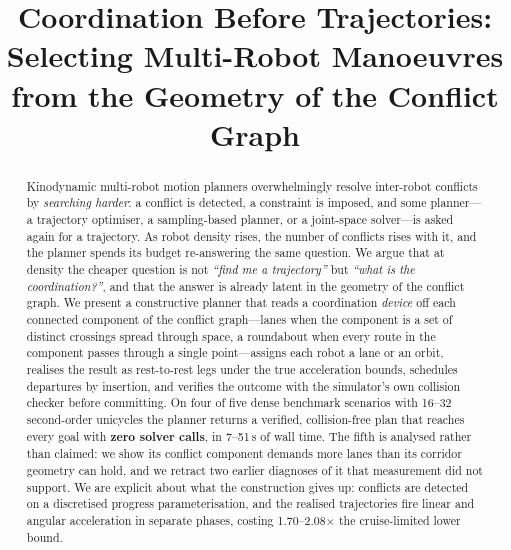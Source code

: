 \documentclass[conference]{IEEEtran}
\begin{document}
\title{Coordination Before Trajectories: Selecting Multi-Robot Manoeuvres\\
from the Geometry of the Conflict Graph}

\author{
}

\maketitle

\begin{abstract}
Kinodynamic multi-robot motion planners overwhelmingly resolve inter-robot conflicts by
\emph{searching harder}: a conflict is detected, a constraint is imposed, and some
planner---a trajectory optimiser, a sampling-based planner, or a joint-space solver---is
asked again for a trajectory. As robot density rises, the number of conflicts rises with
it, and the planner spends its budget re-answering the same question. We argue that at
density the cheaper question is not \emph{``find me a trajectory''} but \emph{``what is the
coordination?''}, and that the answer is already latent in the geometry of the conflict
graph. We present a constructive planner that reads a coordination \emph{device} off each
connected component of the conflict graph---lanes when the component is a set of distinct
crossings spread through space, a roundabout when every route in the component passes
through a single point---assigns each robot a lane or an orbit, realises the result as
rest-to-rest legs under the true acceleration bounds, schedules departures by insertion,
and verifies the outcome with the simulator's own collision checker before committing.
On four of five dense benchmark scenarios with 16--32 second-order unicycles the planner
returns a verified, collision-free plan that reaches every goal with \textbf{zero solver
calls}, in 7--51\,s of wall time. The fifth is analysed rather than claimed: we show its
conflict component demands more lanes than its corridor geometry can hold, and we retract
two earlier diagnoses of it that measurement did not support. We are explicit about what
the construction gives up: conflicts are detected on a discretised progress
parameterisation, and the realised trajectories fire linear and angular acceleration in
separate phases, costing 1.70--2.08$\times$ the cruise-limited lower bound.
\end{abstract}
\end{document}
